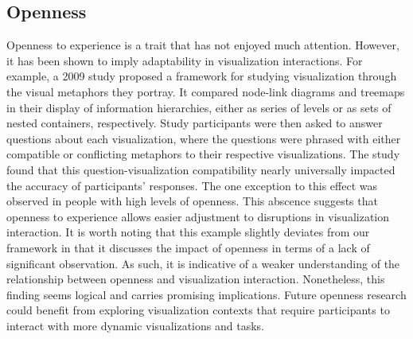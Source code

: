 \documentclass[conference]{IEEEtran}
\begin{document}
\subsection{Openness}\label{Openness}
Openness to experience is a trait that has not enjoyed much attention. However, it has
been shown to imply adaptability in visualization interactions. For example, a 2009 study
proposed a framework for studying visualization through the visual metaphors they
portray. It compared node-link diagrams and treemaps in their display of information
hierarchies, either as series of levels or as sets of nested containers, respectively.
Study participants were then asked to answer questions about each visualization, where
the questions were phrased with either compatible or conflicting metaphors to their
respective visualizations. The study found that this question-visualization compatibility
nearly universally impacted the accuracy of participants’ responses. The one exception
to this effect was observed in people with high levels of openness. This abscence suggests
that openness to experience allows easier adjustment to disruptions in visualization
interaction. It is worth noting that this example slightly deviates from our framework
in that it discusses the impact of openness in terms of a lack of significant observation.
As such, it is indicative of a weaker understanding of the relationship between openness
and visualization interaction. Nonetheless, this finding seems logical and carries
promising implications. Future openness research could benefit from exploring visualization
contexts that require participants to interact with more dynamic visualizations and tasks.
\end{document}
